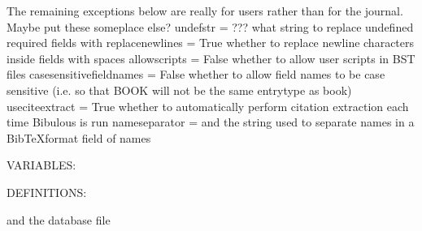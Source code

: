 \documentclass[letterpaper,10pt,english]{sphinxmanual}
\begin{document}
\begin{sphinxVerbatim}[commandchars=\\\{\}]
\PYGZsh{}\PYGZsh{} The remaining exceptions below are really for users rather than for the journal. Maybe put these someplace else?
undefstr = ???                            \PYGZsh{}\PYGZsh{} what string to replace undefined required fields with
replace\PYGZus{}newlines = True                   \PYGZsh{}\PYGZsh{} whether to replace newline characters inside fields with spaces
allow\PYGZus{}scripts = False                     \PYGZsh{}\PYGZsh{} whether to allow user scripts in BST files
case\PYGZus{}sensitive\PYGZus{}field\PYGZus{}names = False        \PYGZsh{}\PYGZsh{} whether to allow field names to be case sensitive (i.e. so that \PYGZdq{}BOOK\PYGZdq{} will not be the same entrytype as \PYGZdq{}book\PYGZdq{})
use\PYGZus{}citeextract = True                    \PYGZsh{}\PYGZsh{} whether to automatically perform citation extraction each time Bibulous is run
name\PYGZus{}separator = and                      \PYGZsh{}\PYGZsh{} the string used to separate names in a BibTeX\PYGZhy{}format field of names

VARIABLES:

DEFINITIONS:
\end{sphinxVerbatim}

and the database file
\end{document}

